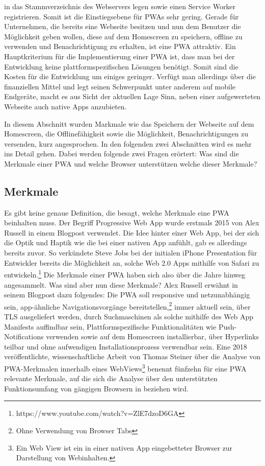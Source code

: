 in das Stammverzeichnis des Webservers legen sowie einen Service Worker registrieren.
Somit ist die Einstiegsebene für PWAs sehr gering. Gerade für Unternehmen,
die bereits eine Webseite besitzen und nun dem Benutzer die Möglichkeit geben wollen,
diese auf dem Homescreen zu speichern, offline zu verwenden und Benachrichtigung zu erhalten,
ist eine PWA attraktiv. Ein Hauptkriterium für die Implementierung einer PWA ist, dass man bei der Entwicklung
keine plattformspezifischen Lösungen benötigt. Somit sind die Kosten für die Entwicklung um einiges
geringer. Verfügt man allerdings über die finanziellen Mittel und legt seinen Schwerpunkt unter anderem
auf mobile Endgeräte, macht es aus Sicht der aktuellen Lage Sinn, neben einer aufgewerteten Webseite
auch native Apps anzubieten.

In diesem Abschnitt wurden Markmale wie das Speichern der Webseite auf dem Homescreen,
die Offlinefähigkeit sowie die Möglichkeit, Benachrichtigungen zu versenden, kurz angesprochen.
In den folgenden zwei Abschnitten wird es mehr ins Detail gehen. Dabei werden folgende
zwei Fragen erörtert: Was sind die Merkmale einer PWA und welche Browser unterstützen
welche dieser Merkmale?

\subsection{Merkmale}
\label{subsec:markmale}
Es gibt keine genaue Definition, die besagt, welche Merkmale eine PWA beinhalten muss.
Der Begriff Progressive Web App wurde erstmals 2015 von Alex Russell in einem Blogpost
verwendet.\cite{PWA2015} Die Idee hinter einer Web App, bei der sich die Optik und Haptik
wie die bei einer nativen App anfühlt, gab es allerdings bereits zuvor. So verkündete
Steve Jobs bei der initialen iPhone Presentation für Entwickler bereits die Möglichkeit
an, solche Web 2.0 Apps mithilfe von Safari zu entwickeln.\footnote{https://www.youtube.com/watch?v=ZlE7dzoD6GA}
Die Merkmale einer PWA haben sich also über die Jahre hinweg angesammelt. Was sind aber
nun diese Merkmale? Alex Russell erwähnt in seinem Blogpost dazu folgendes:
Die PWA soll responsive und netzunabhängig sein, app-ähnliche Navigationsvorgänge bereitstellen,\footnote{Ohne Verwendung von Browser Tabs} 
immer aktuell sein, über TLS ausgeliefert werden, durch Suchmaschinen als solche mithilfe
des Web App Manifests auffindbar sein, Plattformspezifische Funktionalitäten wie Push-Notifications
verwenden sowie auf dem Homescreen installierbar, über Hyperlinks teilbar und ohne aufwendigen
Installationsprozess verwendbar sein.\cite{PWA2015} Eine 2018 veröffentlichte, wissenschaftliche
Arbeit von Thomas Steiner über die Analyse von PWA-Merkmalen innerhalb eines WebViews\footnote{Ein Web View ist ein in einer nativen App eingebetteter Browser zur Darstellung von Webinhalten.}
benennt fünfzehn für eine PWA relevante Merkmale, auf die sich die Analyse über den
unterstützten Funktionsumfang von gängigen Browsern in 
beziehen wird.\cite{WhatIsInAWebView}

